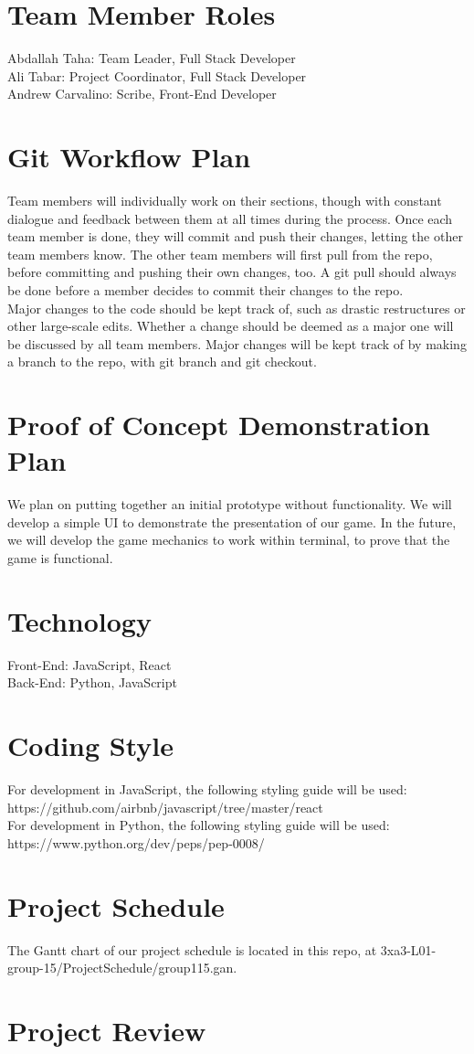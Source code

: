 \documentclass{article}
\begin{document}
\section{Team Member Roles}
Abdallah Taha: Team Leader, Full Stack Developer \\
Ali Tabar: Project Coordinator, Full Stack Developer \\
Andrew Carvalino: Scribe, Front-End Developer \\

\section{Git Workflow Plan}

Team members will individually work on their sections, though with constant dialogue and feedback between them at all times during the process. Once each team member is done, they will commit and push their changes, letting the other team members know. The other team members will first pull from the repo, before committing and pushing their own changes, too. A git pull should always be done before a member decides to commit their changes to the repo.\\
Major changes to the code should be kept track of, such as drastic restructures or other large-scale edits. Whether a change should be deemed as a major one will be discussed by all team members. Major changes will be kept track of by making a branch to the repo, with git branch and git checkout.


\section{Proof of Concept Demonstration Plan}
We plan on putting together an initial prototype without functionality. We will develop a simple UI to demonstrate the presentation of our game. In the future, we will develop the game mechanics to work within terminal, to prove that the game is functional.

\section{Technology}
Front-End: JavaScript, React\\
Back-End: Python, JavaScript

\section{Coding Style}
For development in JavaScript, the following styling guide will be used:\\
https://github.com/airbnb/javascript/tree/master/react \\
For development in Python, the following styling guide will be used:\\ 
https://www.python.org/dev/peps/pep-0008/ \\

\section{Project Schedule}

The Gantt chart of our project schedule is located in this repo, at 3xa3-L01-group-15/ProjectSchedule/group115.gan.

\section{Project Review}
\end{document}
